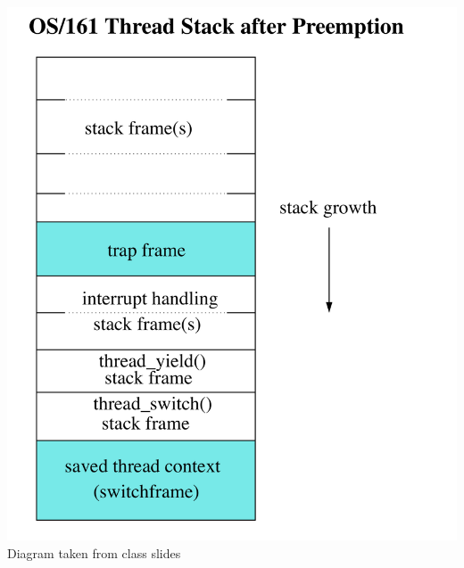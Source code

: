 \documentclass[twoside]{article}
\begin{document}
\begin{center}
\includegraphics[scale=0.2]{3}\\
Diagram taken from class slides 
\end{center}
\end{document}
